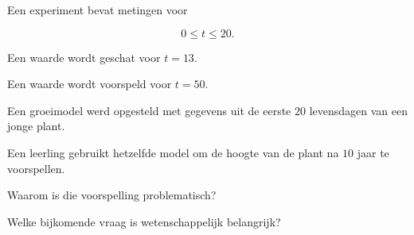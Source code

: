 \documentclass{ximera}
\begin{document}
\begin{oefening}{\oefB \ESS}

Een experiment bevat metingen voor

\[
0\leq t\leq 20.
\]

\begin{question}
Een waarde wordt geschat voor $t=13$.

\begin{multipleChoice}
\end{multipleChoice}
\end{question}

\begin{question}
Een waarde wordt voorspeld voor $t=50$.

\begin{multipleChoice}
\end{multipleChoice}
\end{question}

\end{oefening}


\begin{oefening}{\oefU \ESS}

Een groeimodel werd opgesteld met gegevens uit de eerste
$20$ levensdagen van een jonge plant.

Een leerling gebruikt hetzelfde model om de hoogte van de plant
na $10$ jaar te voorspellen.

\begin{question}
Waarom is die voorspelling problematisch?

\begin{multipleChoice}
\end{multipleChoice}
\end{question}

\begin{question}
Welke bijkomende vraag is wetenschappelijk belangrijk?

\begin{multipleChoice}
\end{multipleChoice}
\end{question}

\end{oefening}
\end{document}
